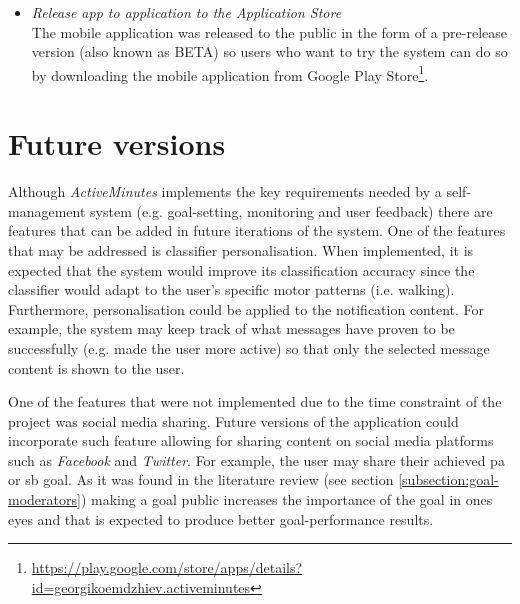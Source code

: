 \begin{itemize}
    \item \textit{Release app to application to the Application Store}\\
    The mobile application was released to the public in the form of a pre-release version (also known as BETA) so users who want to try the system can do so by downloading the mobile application from Google Play Store\footnote{\url{https://play.google.com/store/apps/details?id=georgikoemdzhiev.activeminutes}}.
    
\end{itemize}

\section{Future versions}
Although \textit{ActiveMinutes} implements the key requirements needed by a self-management system (e.g. goal-setting, monitoring and user feedback) there are features that can be added in future iterations of the system. One of the features that may be addressed is classifier personalisation. When implemented, it is expected that the system would improve its classification accuracy since the classifier would adapt to the user's specific motor patterns (i.e. walking). Furthermore, personalisation could be applied to the notification content. For example, the system may keep track of what messages have proven to be successfully (e.g. made the user more active) so that only the selected message content is shown to the user.

One of the features that were not implemented due to the time constraint of the project was social media sharing. Future versions of the application could incorporate such feature allowing for sharing content on social media platforms such as \textit{Facebook} and \textit{Twitter}. For example, the user may share their achieved \gls{pa} or \gls{sb} goal. As it was found in the literature review (see section \ref{subsection:goal-moderators}) making a goal public increases the importance of the goal in ones eyes and that is expected to produce better goal-performance results. 

